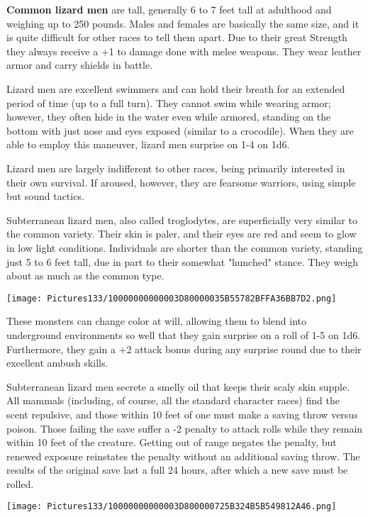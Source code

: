 \documentclass[a4paper,twoside,openany,10pt]{book}
\begin{document}
\begin{multicols}{2}
\textbf{Common lizard men }are tall, generally 6 to 7 feet tall at adulthood and weighing up to 250 pounds. Males and females are basically the same size, and it is quite difficult for other races to tell them apart. Due to their great Strength they always receive a +1 to damage done with melee weapons. They wear leather armor and carry shields in battle.

Lizard men are excellent swimmers and can hold their breath for an extended period of time (up to a full turn). They cannot swim while wearing armor; however, they often hide in the water even while armored, standing on the bottom with just nose and eyes exposed (similar to a crocodile). When they are able to employ this maneuver, lizard men surprise on 1-4 on 1d6.

Lizard men are largely indifferent to other races, being primarily interested in their own survival. If aroused, however, they are fearsome warriors, using simple but sound tactics. 

Subterranean lizard men, also called troglodytes, are superficially very similar to the common variety. Their skin is paler, and their eyes are red and seem to glow in low light conditions. Individuals are shorter than the common variety, standing just 5 to 6 feet tall, due in part to their somewhat "hunched" stance. They weigh about as much as the common type.


\begin{center} \texttt{[image: Pictures133/10000000000003D80000035B55782BFFA36BB7D2.png]} \end{center}


These monsters can change color at will, allowing them to blend into underground environments so well that they gain surprise on a roll of 1-5 on 1d6. Furthermore, they gain a +2 attack bonus during any surprise round due to their excellent ambush skills.

Subterranean lizard men secrete a smelly oil that keeps their scaly skin supple. All mammals (including, of course, all the standard character races) find the scent repulsive, and those within 10 feet of one must make a saving throw versus poison. Those failing the save suffer a -2 penalty to attack rolls while they remain within 10 feet of the creature. Getting out of range negates the penalty, but renewed exposure reinstates the penalty without an additional saving throw. The results of the original save last a full 24 hours, after which a new save must be rolled.

\begin{center} \texttt{[image: Pictures133/10000000000003D800000725B324B5B549812A46.png]} \end{center}



\end{multicols}
\end{document}
